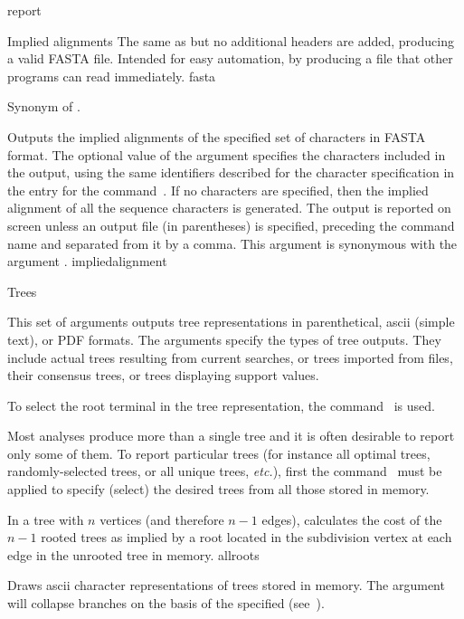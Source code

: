 \begin{command}{report}{}
\begin{arguments}
\begin{argumentgroup}{Implied alignments}
{The same as  
but no additional headers are added, producing a valid FASTA file. 
Intended for easy automation, by producing a file that other programs 
can read immediately.}
{fasta}

{Synonym of .}
{}

{Outputs the implied alignments of the specified
set of characters in FASTA format. The optional value of the
argument specifies the characters included
in the output, using the same identifiers described for the
character specification in the entry for the command~. If no
characters are specified, then the implied alignment of all the
sequence characters is generated. The output is reported on
screen unless an output file (in parentheses) is
specified, preceding the command name and separated from it by a
comma. This argument is synonymous with the argument
.}
{impliedalignment}

\end{argumentgroup}

\begin{argumentgroup}{Trees}
{This set of arguments outputs tree representations
in parenthetical, ascii (simple text), or PDF formats.
The arguments specify the types of tree outputs. They include
actual trees resulting from current searches, or trees imported from
files, their consensus trees, or trees displaying support values.

To select the root terminal in the tree representation, the 
command~ is used.

Most analyses produce more than a single tree and it is
often desirable to report only some of them. To
report particular trees (for instance all optimal trees,
randomly-selected trees, or all unique trees, \emph{etc.}), first the
command~ must be applied to specify (select)
the desired trees from all those stored in memory.} 

{In a tree with $n$ vertices (and therefore $n - 1$ edges),
calculates the cost of the $n - 1$ rooted trees as implied by a
root located in the subdivision vertex at each edge in the unrooted
tree in memory.}
{allroots}

{Draws ascii character representations of trees stored in memory. The
argument  will collapse branches on the basis 
of the \poylident specified (see~). }
{}


\end{argumentgroup}
\end{arguments}
\end{command}
